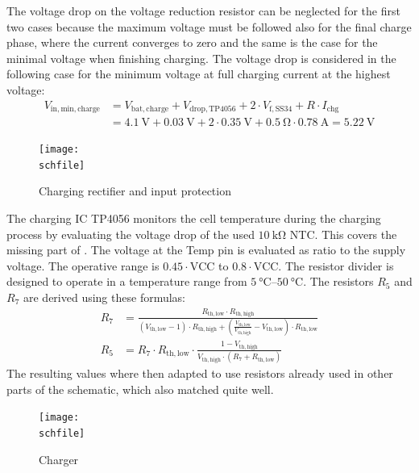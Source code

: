 The voltage drop on the voltage reduction resistor can be neglected for the first two cases because the maximum voltage must be followed also for the final charge phase, where the current converges to zero and the same is the case for the minimal voltage when finishing charging. 
The voltage drop is considered in the following case for the minimum voltage at full charging current at the highest voltage:
\begin{align}
	V_\mathrm{in,min,charge} &= V_\mathrm{bat,charge} + V_\mathrm{drop, TP4056} + 2\cdot V_\mathrm{f,SS34} + R \cdot I_\mathrm{chg}\\
	&= \SI{4.1}{\V} + \SI{0.03}{\V} + 2\cdot \SI{0.35}{\V} + \SI{0.5}{\ohm} \cdot  \SI{0.78}{\A} = \SI{5.22}{\V}
\end{align}

\begin{figure}[h!]
    \centering
    \texttt{[image: \\schfile]}
    \caption{Charging rectifier and input protection}
    \label{fig_chg_input}
\end{figure}

The charging IC TP4056 \cite{MSKSEMI:TP4056} monitors the cell temperature during the charging process by evaluating the voltage drop of the used $\SI{10}{\kilo\ohm}$ \ac{NTC}. This covers the missing part of . The voltage at the Temp pin is evaluated as ratio to the supply voltage. The operative range is $\num{0.45} \cdot \mathrm{VCC}$ to $\num{0.8} \cdot \mathrm{VCC}$. The resistor divider is designed to operate in a temperature range from $\qtyrange{5}{50}{\celsius}$. The resistors $R_5$ and $R_7$ are derived using these formulas: 
\begin{align}
R_7 &= \frac{R_\mathrm{th,low}\cdot R_\mathrm{th,high}}{(V_\mathrm{th,low}-1)\cdot R_\mathrm{th,high} + \left(\frac{V_\mathrm{th,low}}{V_\mathrm{th,high}}-V_\mathrm{th,low}\right)\cdot R_\mathrm{th,low}}\\
R_5 &= R_7\cdot R_\mathrm{th,low}\cdot \frac{1-V_\mathrm{th,high}}{V_\mathrm{th,high}\cdot (R_7+R_\mathrm{th,low})}
\end{align}
The resulting values where then adapted to use resistors already used in other parts of the schematic, which also matched quite well. 

\begin{figure}[h!]
    \centering
    \texttt{[image: \\schfile]}
    \caption{Charger}
    \label{fig_charger}
\end{figure}

